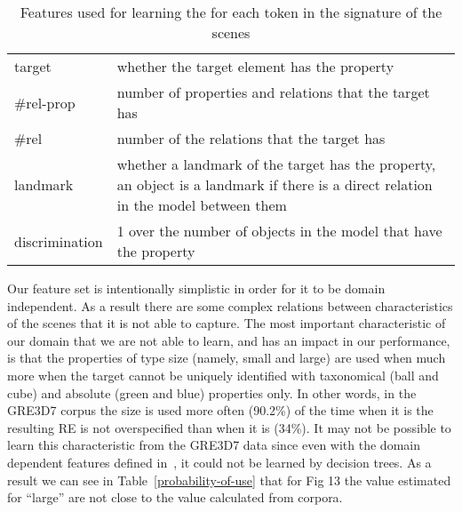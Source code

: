 \begin{small}
\begin{table}[h!]
\begin{center}
\begin{tabular}{|l|p{10cm}|}
\hline
target & whether the target element has the property \\
\#rel-prop & number of properties and relations that the target has\\
\#rel & number of the relations that the target has \\
landmark & whether a landmark of the target has the property, an object is a landmark if there is a direct relation in the model between them \\
discrimination & 1 over the number of objects in the model that have the property \\
\hline
\end{tabular}
\caption{Features used for learning the \puse for each token in the signature of the scenes \label{features}}
\end{center}
\end{table}
\end{small}

Our feature set is intentionally simplistic in order for it to be domain independent. As a result there are some complex relations between characteristics of the scenes that it is not able to capture. The most important characteristic of our domain that we are not able to learn, and has an impact in our performance, is that the properties of type size (namely, small and large) are used when much more when the target cannot be uniquely identified with taxonomical (ball and cube) and absolute (green and blue) properties only. In other words, in the GRE3D7 corpus the size is used more often (90.2\%) of the time when it is the resulting RE is not overspecified than when it is (34\%). It may not be possible to learn this characteristic from the GRE3D7 data since even with the domain dependent features defined in~\cite[Chapter 6]{viet:gene11}, it could not be learned by decision trees. As a result we can see in Table~\ref{probability-of-use} that for Fig 13 the value estimated for ``large'' are not close to the value calculated from corpora. 


